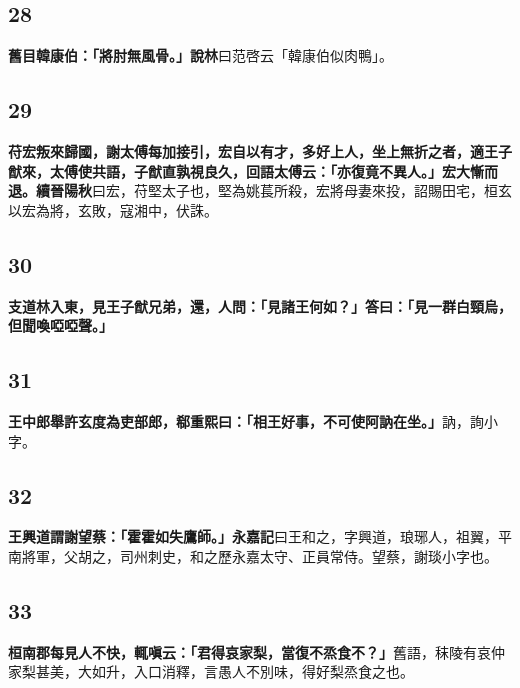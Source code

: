 \subsection*{28}

\textbf{舊目韓康伯：「將肘無風骨。」}{\footnotesize \textbf{說林}曰范啓云「韓康伯似肉鴨」。}

\subsection*{29}

\textbf{苻宏叛來歸國，謝太傅每加接引，宏自以有才，多好上人，坐上無折之者，適王子猷來，太傅使共語，子猷直孰視良久，回語太傅云：「亦復竟不異人。」宏大慚而退。}{\footnotesize \textbf{續晉陽秋}曰宏，苻堅太子也，堅為姚萇所殺，宏將母妻來投，詔賜田宅，桓玄以宏為將，玄敗，寇湘中，伏誅。}

\subsection*{30}

\textbf{支道林入東，見王子猷兄弟，還，人問：「見諸王何如？」答曰：「見一群白頸烏，但聞喚啞啞聲。」}

\subsection*{31}

\textbf{王中郎舉許玄度為吏部郎，郗重熙曰：「相王好事，不可使阿訥在坐。」}{\footnotesize 訥，詢小字。}

\subsection*{32}

\textbf{王興道謂謝望蔡：「霍霍如失鷹師。」}{\footnotesize \textbf{永嘉記}曰王和之，字興道，琅琊人，祖翼，平南將軍，父胡之，司州刺史，和之歷永嘉太守、正員常侍。望蔡，謝琰小字也。}

\subsection*{33}

\textbf{桓南郡每見人不快，輒嗔云：「君得哀家梨，當復不烝食不？」}{\footnotesize 舊語，秣陵有哀仲家梨甚美，大如升，入口消釋，言愚人不別味，得好梨烝食之也。}